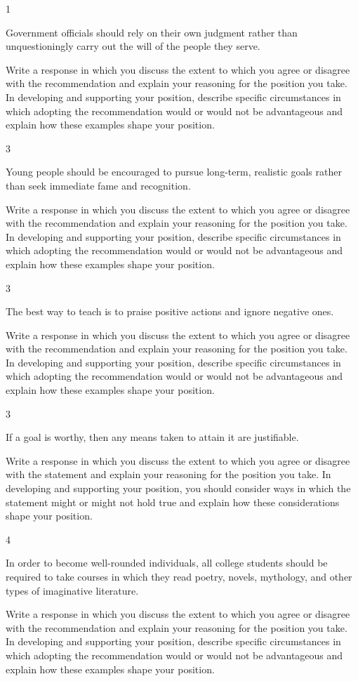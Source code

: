 \documentclass[]{article}
\begin{document}
1

Government officials should rely on their own judgment rather than
unquestioningly carry out the will of the people they serve.

Write a response in which you discuss the extent to which you agree or
disagree with the recommendation and explain your reasoning for the
position you take. In developing and supporting your position, describe
specific circumstances in which adopting the recommendation would or
would not be advantageous and explain how these examples shape your
position.

3

Young people should be encouraged to pursue long-term, realistic goals
rather than seek immediate fame and recognition.

Write a response in which you discuss the extent to which you agree or
disagree with the recommendation and explain your reasoning for the
position you take. In developing and supporting your position, describe
specific circumstances in which adopting the recommendation would or
would not be advantageous and explain how these examples shape your
position.

3

The best way to teach is to praise positive actions and ignore negative
ones.

Write a response in which you discuss the extent to which you agree or
disagree with the recommendation and explain your reasoning for the
position you take. In developing and supporting your position, describe
specific circumstances in which adopting the recommendation would or
would not be advantageous and explain how these examples shape your
position.

3

If a goal is worthy, then any means taken to attain it are justifiable.

Write a response in which you discuss the extent to which you agree or
disagree with the statement and explain your reasoning for the position
you take. In developing and supporting your position, you should
consider ways in which the statement might or might not hold true and
explain how these considerations shape your position.

4

In order to become well-rounded individuals, all college students should
be required to take courses in which they read poetry, novels,
mythology, and other types of imaginative literature.

Write a response in which you discuss the extent to which you agree or
disagree with the recommendation and explain your reasoning for the
position you take. In developing and supporting your position, describe
specific circumstances in which adopting the recommendation would or
would not be advantageous and explain how these examples shape your
position.
\end{document}
